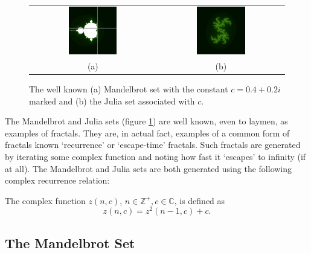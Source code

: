 \begin{figure}
\centering
\begin{tabular}{c@{$\quad$}c}
\includegraphics[width=0.4\textwidth]{euc_mandel_julia_pos} 
 & \includegraphics[width=0.4\textwidth]{julia_euc} \\
                          (a) & (b)
\end{tabular}
\caption{\label{fig:euclidean_sets}The well known (a) Mandelbrot set with
  the constant $c = 0.4 + 0.2i$ marked and (b) the Julia
  set associated with $c$.}
\end{figure}

The Mandelbrot and Julia sets (figure \ref{fig:euclidean_sets}) are well known, even to
laymen, as examples of fractals. They are, in actual fact, examples of a 
common form of fractals known `recurrence' or `escape-time' fractals.
Such fractals are generated by iterating some complex function and noting
how fast it `escapes' to infinity (if at all).
The Mandelbrot and Julia sets are both generated using the following 
complex recurrence relation\cite{FRAC:Mandelbrot, FRAC:JuliaMandelBook}:
\begin{definition}
The complex function $z(n,c)$, $n \in {\mathbb Z}^+, c \in {\mathbb C}$,
    is defined as
\[
z(n,c) = z^2(n-1,c) + c.
\]
\end{definition}

\subsection{The Mandelbrot Set}

